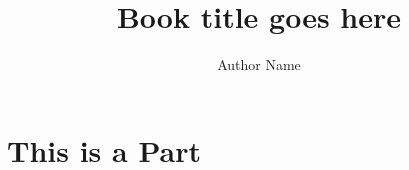\documentclass[ChapterTOCs,krantz1]{krantz}
\begin{document}
\title{Book title goes here}

\author{Author Name}

\maketitle

\frontmatter




\listoffigures
\listoftables
\tableofcontents

\mainmatter



\setcounter{page}{1}
\part{This is a Part}

%




\clearpage
\printindex
\end{document}
